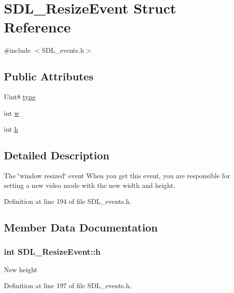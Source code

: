 \hypertarget{structSDL__ResizeEvent}{\section{S\+D\+L\+\_\+\+Resize\+Event Struct Reference}
\label{structSDL__ResizeEvent}
}


{\ttfamily \#include $<$S\+D\+L\+\_\+events.\+h$>$}

\subsection*{Public Attributes}
\begin{DoxyCompactItemize}
\item 
Uint8 \hyperlink{structSDL__ResizeEvent_a0f35cba640e999f4dd77e4267b812525}{type}
\item 
int \hyperlink{structSDL__ResizeEvent_acd9eca9322c2d247bb0329e2ea97fc0f}{w}
\item 
int \hyperlink{structSDL__ResizeEvent_a323addc213067775cccb1c1032aebf8b}{h}
\end{DoxyCompactItemize}


\subsection{Detailed Description}
The \char`\"{}window resized\char`\"{} event When you get this event, you are responsible for setting a new video mode with the new width and height. 

Definition at line 194 of file S\+D\+L\+\_\+events.\+h.



\subsection{Member Data Documentation}
\hypertarget{structSDL__ResizeEvent_a323addc213067775cccb1c1032aebf8b}{
\subsubsection[{h}]{\setlength{\rightskip}{0pt plus 5cm}int S\+D\+L\+\_\+\+Resize\+Event\+::h}}\label{structSDL__ResizeEvent_a323addc213067775cccb1c1032aebf8b}
New height 

Definition at line 197 of file S\+D\+L\+\_\+events.\+h.

